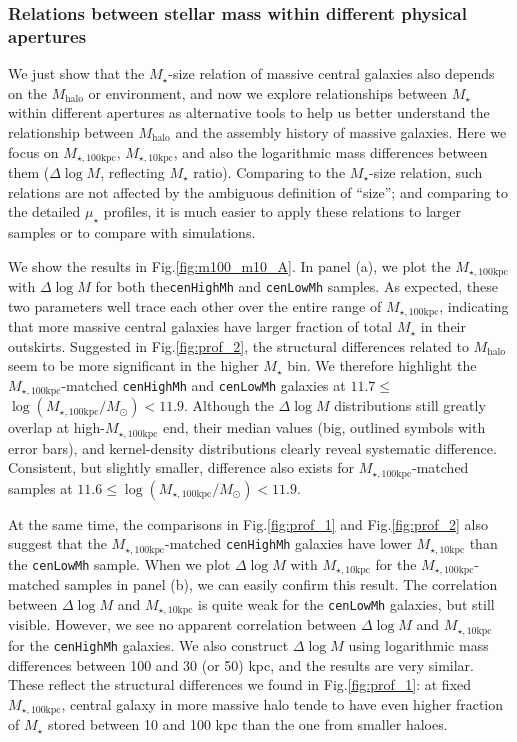 \documentclass{emulateapj}
\def\rbcg{\texttt{cenHighMh}}
\def\nbcg{\texttt{cenLowMh}}
\def\mstar{{$M_{\star}$}}
\def\mhalo{{$M_{\mathrm{halo}}$}}
\def\minn{{$M_{\star,10\mathrm{kpc}}$}}
\def\mtot{{$M_{\star,100\mathrm{kpc}}$}}
\def\logmtot{{$\log (M_{\star,100\mathrm{kpc}}/M_{\odot})$}}
\def\mden{{$\mu_{\star}$}}
\newcommand{\update}[1]{\textcolor{Bittersweet}{#1}}
\begin{document}
\begin{CJK*}{UTF8}{gbsn}
\subsubsection{Relations between stellar mass within different physical apertures}
    \label{sssec:m100_m10}
    
    We just show that the \mstar{}-size relation of massive central galaxies also 
    depends on the \mhalo{} or environment, and now we explore relationships between 
    \mstar{} within different apertures as alternative tools to help
    us better understand the relationship between \mhalo{} and the assembly history of 
    massive galaxies.  
    Here we focus on \mtot{}, \minn{}, and also the logarithmic mass differences 
    between them ($\Delta \log M$, reflecting \mstar{} ratio). 
    Comparing to the \mstar{}-size relation, such relations are not affected by the 
    ambiguous definition of ``size''; and comparing to the detailed \mden{} profiles, 
    it is much easier to apply these relations to larger samples or to compare with 
    simulations.
   
    We show the results in Fig.\ref{fig:m100_m10_A}.  
    In panel (a), we plot the \mtot{} with $\Delta \log M$ for both the\rbcg{} 
    and \nbcg{} samples. 
    As expected, these two parameters well trace each other over the entire range of
    \mtot{}, indicating that more massive central galaxies have larger 
    fraction of total \mstar{} in their outskirts. 
    Suggested in Fig.\ref{fig:prof_2}, the structural differences related to 
    \mhalo{} seem to be more significant in the higher \mstar{} bin. 
    We therefore highlight the \mtot{}-matched \rbcg{} and \nbcg{} galaxies at 
    $11.7 \leq$\logmtot$< 11.9$. 
    Although the $\Delta \log M$ distributions still greatly overlap at high-\mtot{} 
    end, their median values (big, outlined symbols with error bars),
    and kernel-density distributions clearly reveal systematic difference. 
    Consistent, but slightly smaller, difference also exists for \mtot{}-matched 
    samples at $11.6 \leq$\logmtot$< 11.9$. 
    
    At the same time, the comparisons in Fig.\ref{fig:prof_1} and 
    Fig.\ref{fig:prof_2} also suggest that the \mtot{}-matched \rbcg{} galaxies 
    have lower \minn{} than the \nbcg{} sample. 
    \update{
    When we plot $\Delta \log M$ with \minn{} for the \mtot{}-matched samples in 
    panel (b), we can easily confirm this result.
    The correlation between $\Delta \log M$ and \minn{} is quite weak for the 
    \nbcg{} galaxies, but still visible. 
    However, we see no apparent correlation between $\Delta \log M$ and \minn{} 
    for the \rbcg{} galaxies. 
    We also construct $\Delta \log M$ using logarithmic mass differences between 
    100 and 30 (or 50) kpc, and the results are very similar.   
    These reflect the structural differences we found in Fig.\ref{fig:prof_1}: 
    at fixed \mtot{}, central galaxy in more massive halo tende to have even higher 
    fraction of \mstar{} stored between 10 and 100 kpc than the one from smaller 
    haloes.}
    

\end{CJK*}
\end{document}
